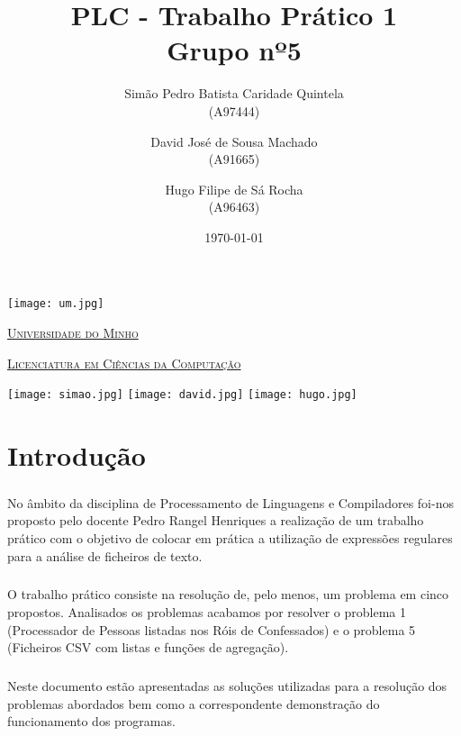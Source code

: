 \documentclass[11pt,a4paper]{report}
\title{PLC - Trabalho Prático 1\\
	\large Grupo nº5}
\author{Simão Pedro Batista Caridade Quintela \\ (A97444) 
        \and David José de Sousa Machado \\ (A91665)
        \and Hugo Filipe de Sá Rocha \\ (A96463)
       } %
\date{\today} %
\begin{document}
	\begin{minipage}{0.9\linewidth}
        \centering
		\texttt{[image: um.jpg]}\par\vspace{1 cm}
		\href{https://www.uminho.pt/PT}
		{\scshape\LARGE Universidade do Minho} \par
		\vspace{0.6cm}
		\href{https://lcc.di.uminho.pt}
		{\scshape\Large Licenciatura em Ciências da Computação} \par
		\maketitle
		
		\texttt{[image: simao.jpg]}
	    \texttt{[image: david.jpg]}	
        \texttt{[image: hugo.jpg]}
        
		
	\end{minipage}
	
	\tableofcontents
	
	\pagebreak
	
	\chapter{Introdução}
% 
    \paragraph{}
    No âmbito da disciplina de Processamento de Linguagens e Compiladores foi-nos proposto pelo docente Pedro Rangel Henriques a realização de um trabalho prático com o objetivo de colocar em prática a utilização de expressões regulares para a análise de ficheiros de texto.

    \paragraph{}
    O trabalho prático consiste na resolução de, pelo menos, um problema em cinco propostos. Analisados os problemas acabamos por resolver o problema 1 (Processador de Pessoas listadas nos Róis de Confessados) e o problema 5 (Ficheiros CSV com listas e funções de agregação).

    \paragraph{}
    Neste documento estão apresentadas as soluções utilizadas para a resolução dos problemas abordados bem como a correspondente demonstração do funcionamento dos programas. 
\end{document}
